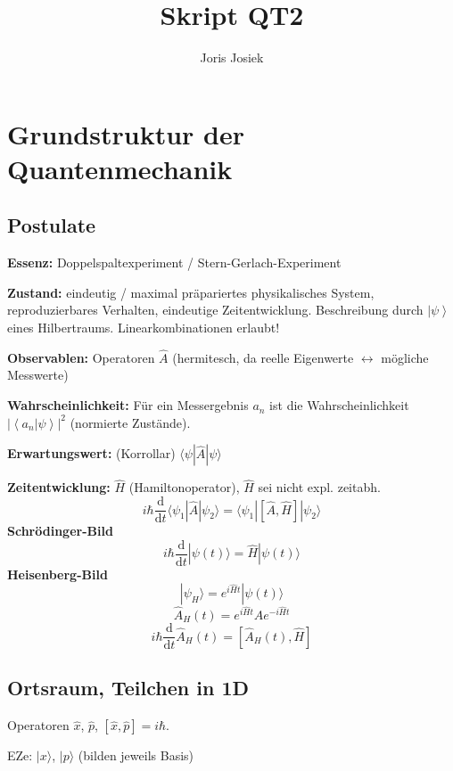 \documentclass[11pt,a4paper]{report}
\author{Joris Josiek}
\title{Skript QT2}
\begin{document}
\maketitle

\tableofcontents

\chapter{Grundstruktur der Quantenmechanik}

\section{Postulate}

\textbf{Essenz:} Doppelspaltexperiment / Stern-Gerlach-Experiment\par 
\textbf{Zustand:} eindeutig / maximal präpariertes physikalisches System, reproduzierbares Verhalten, eindeutige Zeitentwicklung. Beschreibung durch $\left|\psi\right\rangle$ eines Hilbertraums. Linearkombinationen erlaubt!\par 
\textbf{Observablen:} Operatoren $\hat{A}$ (hermitesch, da reelle Eigenwerte $\leftrightarrow$ mögliche Messwerte)\par 
\textbf{Wahrscheinlichkeit:} Für ein Messergebnis $a_n$ ist die Wahrscheinlichkeit $\left|\left\langle a_n|\psi\right\rangle\right|^2$ (normierte Zustände).\par 
\textbf{Erwartungswert:} (Korrollar) $\langle\psi|\hat{A}|\psi\rangle$\par 
\textbf{Zeitentwicklung:} $\hat{H}$ (Hamiltonoperator), $\hat{H}$ sei nicht expl. zeitabh.
$$i\hbar\frac{\mathrm{d}}{\mathrm{d}t}\langle\psi_1|\hat{A}|\psi_2\rangle = \langle\psi_1|[\hat{A},\hat{H}]|\psi_2\rangle$$
\textbf{Schrödinger-Bild}
$$i\hbar\frac{\mathrm{d}}{\mathrm{d}t}|\psi (t)\rangle = \hat{H}|\psi (t)\rangle$$
\textbf{Heisenberg-Bild}
$$|\psi_H\rangle = e^{i\hat{H}t}|\psi (t)\rangle$$
$$\hat{A}_H(t)=e^{i\hat{H}t}\hat{A}e^{-i\hat{H}t}$$
$$i\hbar\frac{\mathrm{d}}{\mathrm{d}t}\hat{A}_H(t)=[\hat{A}_H(t),\hat{H}]$$

\section{Ortsraum, Teilchen in 1D}

Operatoren $\hat{x}$, $\hat{p}$, $[\hat{x},\hat{p}]=i\hbar$.\par 
EZe: $|x\rangle$, $|p\rangle$ (bilden jeweils Basis)\par 
\end{document}
